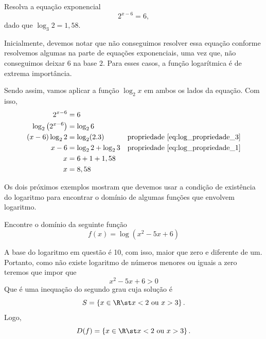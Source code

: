 \begin{example}
    Resolva a equação exponencial
    \[
      2^{x-6} = 6,
    \]
    dado que \(\log_3 2 = 1,58\).

    \solution
    Inicialmente, devemos notar que não conseguimos resolver essa equação
    conforme resolvemos algumas na parte de equações exponenciais, uma vez que,
    não conseguimos deixar $6$ na base $2$. Para esses casos, a função
    logarítmica é de extrema importância.

    Sendo assim, vamos aplicar a função $\log_2 x$ em ambos os lados da
    equação. Com isso,
    \begin{align*}
      2^{x-6}                      & = 6                   \\
      \log_2 \left(2^{x-6}\right)  & = \log_2 6            \\
      (x-6) \log_2 2               & = \log_2(2.3)         & \text{propriedade~\eqref{eq:log_propriedade_3}} \\
      x-6                          & = \log_2 2 + \log_2 3 & \text{propriedade~\eqref{eq:log_propriedade_1}} \\
      x                            & = 6 + 1 + 1,58        \\
      x                            & = 8,58
    \end{align*}
\end{example}

Os dois próximos exemplos mostram que devemos usar a condição de existência do
logaritmo para encontrar o domínio de algumas funções que envolvem logaritmo.

\begin{example}
  Encontre o domínio da seguinte função
  \[
    f(x) = \log \left( x^2 - 5x + 6 \right)
  \]

  \solution
  A base do logaritmo em questão é 10, com isso, maior que zero e diferente
  de um. Portanto, como não existe logaritmo de números menores ou iguais a
  zero teremos que impor que
  \[
    x^2-5x+6 >0
  \]
  Que é uma inequação do segundo grau cuja solução é
  \[
    S = \left\{ x \in \R \st x<2 \text{ ou } x>3 \right\}.
  \]
  Logo,
  \[
    D(f) = \left\{ x \in \R \st x<2 \text{ ou } x>3 \right\}.
  \]
\end{example}

